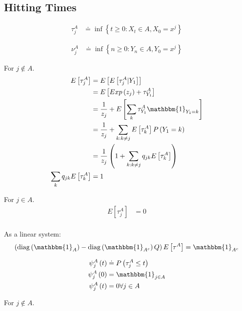\subsection{Hitting Times}

\begin{align}
	\tau^{A}_{j} &\doteq \inf\left\{t \geq 0 : X_t \in A, X_0 = x^j\right\}
\end{align}

\begin{align}
	\nu^{A}_{j} &\doteq \inf\left\{n \geq 0 : Y_n \in A, Y_0 = x^j\right\}
\end{align}

For $j \not\in A$.
\begin{align}
	E\left[\tau^{A}_{j}\right] &= E\left[E\left[\tau^{A}_{j} | Y_1 \right]\right] \\
        &= E\left[ Exp\left(z_j\right) + \tau^{A}_{Y_1} \right] \\
        &=  \frac{1}{z_j} + E\left[\sum_{k}\tau^{A}_{Y_1}\mathbbm{1}_{Y_1 = k}\right] \\
        &=  \frac{1}{z_j} + \sum_{k: k\neq j}E\left[\tau^{A}_{k}\right] P\left(Y_1 = k\right) \\
        &=  \frac{1}{z_j}\left(1 + \sum_{k: k\neq j}q_{jk}E\left[\tau^{A}_{k}\right]\right)     \\
  \sum_{k}q_{jk}E\left[\tau^{A}_{k}\right] &= 1 \\
\end{align}

For $j \in A$.
\begin{align}
	E\left[\tau^{A}_{j}\right] &= 0 \\
\end{align}

As a linear system:
\begin{align}
	\left(\diag\left(\mathbbm{1}_A\right) - \diag\left(\mathbbm{1}_{A^c}\right)Q\right)E\left[\tau^{A}\right] =\mathbbm{1}_{A^c}\\
\end{align}


\begin{align}
\psi_j^A\left(t\right) &\doteq P\left(\tau^A_j \leq t\right) \\
\psi_j^A\left(0\right) &= \mathbbm{1}_{j\in A} \\
\psi_j^A\left(t\right) &= 0 \forall j \in A \\                       
\end{align}

For $j \not\in A$.

